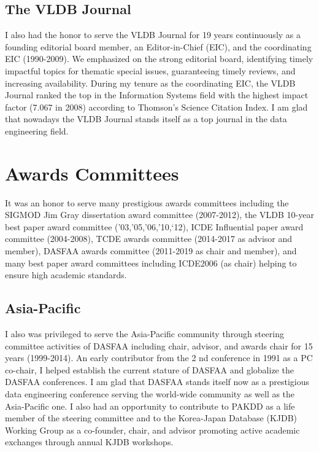 \documentclass[11pt]{article}
\begin{document}
\subsection*{The VLDB Journal}
I also had the honor to serve the VLDB Journal for 19 years continuously as a founding editorial board
member, an Editor-in-Chief (EIC), and the coordinating EIC (1990-2009). We emphasized on the
strong editorial board, identifying timely impactful topics for thematic special issues, guaranteeing
timely reviews, and increasing availability. During my tenure as the coordinating EIC, the VLDB
Journal ranked the top in the Information Systems field with the highest impact factor (7.067 in 2008)
according to Thomson’s Science Citation Index. I am glad that nowadays the VLDB Journal stands
itself as a top journal in the data engineering field.
\section*{Awards Committees}
It was an honor to serve many prestigious awards committees including the SIGMOD Jim Gray
dissertation award committee (2007-2012), the VLDB 10-year best paper award committee
(’03,’05,’06,’10,‘12), ICDE Influential paper award committee (2004-2008), TCDE awards committee
(2014-2017 as advisor and member), DASFAA awards committee (2011-2019 as chair and member),
and many best paper award committees including ICDE2006 (as chair) helping to ensure high
academic standards.
\subsection*{Asia-Pacific}
I also was privileged to serve the Asia-Pacific community through steering committee activities of
DASFAA including chair, advisor, and awards chair for 15 years (1999-2014). An early contributor
from the 2 nd conference in 1991 as a PC co-chair, I helped establish the current stature of DASFAA
and globalize the DASFAA conferences. I am glad that DASFAA stands itself now as a prestigious
data engineering conference serving the world-wide community as well as the Asia-Pacific one. I also
had an opportunity to contribute to PAKDD as a life member of the steering committee and to the
Korea-Japan Database (KJDB) Working Group as a co-founder, chair, and advisor promoting active
academic exchanges through annual KJDB workshops.
\end{document}
